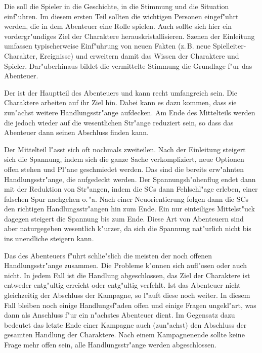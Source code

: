 Die  soll die Spieler in die Geschichte, in die Stimmung und die Situation einf"uhren. Im diesem ersten Teil sollten die wichtigen Personen eingef"uhrt werden, die in dem Abenteuer eine Rolle spielen. Auch sollte sich hier ein vordergr"undiges Ziel der Charaktere herauskristallisieren. Szenen der Einleitung umfassen typischerweise Einf"uhrung von neuen Fakten (z.\,B. neue Spielleiter-Charakter, Ereignisse) und erweitern damit das Wissen der Charaktere und Spieler. Dar"uberhinaus bildet die vermittelte Stimmung die Grundlage f"ur das Abenteuer.

Der  ist der Hauptteil des Abenteuers und kann recht umfangreich sein. Die Charaktere arbeiten auf ihr Ziel hin. Dabei kann es dazu kommen, dass sie zun"achst weitere Handlungsstr"ange aufdecken. Am Ende des Mittelteils werden die jedoch wieder auf die wesentlichen Str"ange reduziert sein, so dass das Abenteuer dann seinen Abschluss finden kann.

Der Mittelteil l"asst sich oft nochmals zweiteilen. Nach der Einleitung steigert sich die Spannung, indem sich die ganze Sache verkompliziert, neue Optionen offen stehen und Pl"ane geschmiedet werden. Das sind die bereits erw"ahnten Handlungsstr"ange, die aufgedeckt werden. Der Spannungsh"ohenflug endet dann mit der Reduktion von Str"angen, indem die SCs dann Fehlschl"age erleben, einer falschen Spur nachgehen o.\,"a. Nach einer Neuorientierung folgen dann die SCs den richtigen Handlungsstr"angen hin zum Ende. Ein nur einteiliges Mittelst"uck dagegen steigert die Spannung bis zum Ende. Diese Art von Abenteuern sind aber naturgegeben wesentlich k"urzer, da sich die Spannung nat"urlich nicht bis ins unendliche steigern kann.

Das  des Abenteuers f"uhrt schlie"slich die meisten der noch offenen Handlungsstr"ange zusammen. Die Probleme k"onnen sich aufl"osen oder auch nicht. In jedem Fall ist die Handlung abgeschlossen, das Ziel der Charaktere ist entweder entg"ultig erreicht oder entg"ultig verfehlt. Ist das Abenteuer nicht gleichzeitig der Abschluss der Kampagne, so l"auft diese noch weiter. In diesem Fall bleiben noch einige Handlungsf"aden offen und einige Fragen ungekl"art, was dann als Anschluss f"ur ein n"achstes Abenteuer dient. Im Gegensatz dazu bedeutet das letzte Ende einer Kampagne auch (zun"achst) den Abschluss der gesamten Handlung der Charaktere. Nach einem Kampagnenende sollte keine Frage mehr offen sein, alle Handlungsstr"ange werden abgeschlossen.

